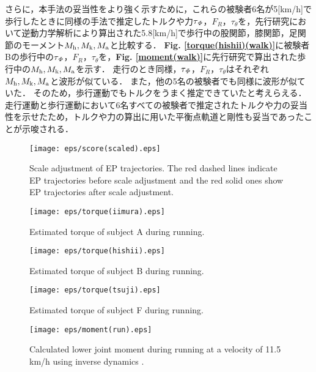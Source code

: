 さらに，本手法の妥当性をより強く示すために，これらの被験者6名が5[km/h]で歩行したときに同様の手法で推定したトルクや力$\tau_{\it \Phi}$，$F_R$，$\tau_{\theta}$を，先行研究\cite{Eng1995}において逆動力学解析により算出された5.8[km/h]で歩行中の股関節，膝関節，足関節のモーメント$M_{\rm h},M_{\rm k},M_{\rm a}$と比較する．
{\bf Fig. \ref{torque(hishii)(walk)}}に被験者Bの歩行中の$\tau_{\it \Phi}$，$F_R$，$\tau_{\theta}$を，{\bf Fig. \ref{moment(walk)}}に先行研究で算出された歩行中の$M_{\rm h},M_{\rm k},M_{\rm a}$を示す．
走行のとき同様，$\tau_{\it \Phi}$，$F_R$，$\tau_{\theta}$はそれぞれ$M_{\rm h},M_{\rm k},M_{\rm a}$と波形が似ている．
また，他の5名の被験者でも同様に波形が似ていた．
そのため，歩行運動でもトルクをうまく推定できていたと考えらえる．
走行運動と歩行運動において6名すべての被験者で推定されたトルクや力の妥当性を示せたため，トルクや力の算出に用いた平衡点軌道と剛性も妥当であったことが示唆される．
%
\begin{figure}[!t]
 \begin{center}
  \texttt{[image: eps/score(scaled).eps]}
  \caption{Scale adjustment of EP trajectories. The red dashed lines indicate EP trajectories before scale adjustment and the red solid ones show EP trajectories after scale adjustment.}
  \label{score(scaled)}
 \end{center}
\end{figure}
%
\begin{figure}[!t]
 \begin{center}
  \texttt{[image: eps/torque(iimura).eps]}
  \caption{Estimated torque of subject A during running.}
  \label{torque(iimura)}
 \end{center}
\end{figure}
%
\begin{figure}[!t]
 \begin{center}
  \texttt{[image: eps/torque(hishii).eps]}
  \caption{Estimated torque of subject B during running.}
  \label{torque(hishii)}
 \end{center}
\end{figure}
%
\begin{figure}[!t]
 \begin{center}
  \texttt{[image: eps/torque(tsuji).eps]}
  \caption{Estimated torque of subject F during running.}
  \label{torque(tsuji)}
 \end{center}
\end{figure}
%
\begin{figure}[!t]
 \begin{center}
  \texttt{[image: eps/moment(run).eps]}
  \caption{Calculated lower joint moment during running at a velocity of 11.5 km/h using inverse dynamics \cite{Novacheck1998}.}
  \label{moment(run)}
 \end{center}
\end{figure}
